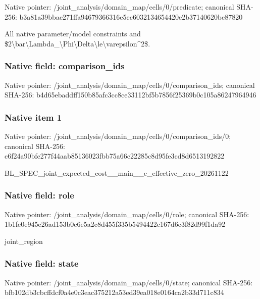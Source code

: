 \documentclass[10pt,a4paper]{article}
\begin{document}
Native pointer: /joint\_analysis/domain\_m\allowbreak{}ap/cells/0/predicate; canonical SHA-256: b3a81a39bbac271ffa946793\allowbreak{}66316e5ec6032134654420e2\allowbreak{}b37140620bc87820


All native parameter/model constraints and \$2\textbackslash{}bar\textbackslash{}Lambda\_\textbackslash{}Phi\textbackslash{}Delta\allowbreak{}\textbackslash{}le\textbackslash{}varepsilon\textasciicircum{}2\$.


\subsubsection{Native field: comparison\_ids}


Native pointer: /joint\_analysis/domain\_m\allowbreak{}ap/cells/0/comparison\_id\allowbreak{}s; canonical SHA-256: b4d65ebaddff150b85afc3cc\allowbreak{}8ce33112bf5b7856f25369b0\allowbreak{}c105a86247964946



\subsubsection{Native item 1}


Native pointer: /joint\_analysis/domain\_m\allowbreak{}ap/cells/0/comparison\_id\allowbreak{}s/0; canonical SHA-256: c6f24a90bfc277f44aab8513\allowbreak{}6023fbb75a66c22285c8d95f\allowbreak{}e3cd8d6513192822


BL\_SPEC\_joint\_expected\_c\allowbreak{}ost\_\_main\_\_c\_effective\_z\allowbreak{}ero\_20261122


\subsubsection{Native field: role}


Native pointer: /joint\_analysis/domain\_map/cells/0/role; canonical SHA-256: 1b1fe0e945e26ad153b0c6e5\allowbreak{}a2c8d455f335b5494422c167\allowbreak{}d6c3f82d99f1da92


joint\_region


\subsubsection{Native field: state}


Native pointer: /joint\_analysis/domain\_m\allowbreak{}ap/cells/0/state; canonical SHA-256: bfb102db3cbcffdcf0a4e0c3\allowbreak{}eac375212a53ed39ea018e01\allowbreak{}64ca2b33d711c834
\end{document}
